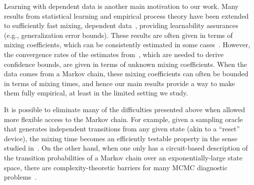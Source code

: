 Learning with dependent data is another main motivation to our work.
Many results from statistical learning and empirical process theory
have been extended to sufficiently fast mixing, dependent
data~\citep[e.g.,][]{Yu94,MR1921877,gamarnik03,MoRo08,MoRo09,DBLP:conf/nips/SteinwartC09,Steinwart2009175},
providing learnability assurances (e.g., generalization error bounds).
These results are often given in terms of mixing coefficients, which
can be consistently estimated in some cases~\citet{McDoShaSche11}.
However, the convergence rates of the estimates
from~\citet{McDoShaSche11}, which are needed to derive confidence
bounds, are given in terms of unknown mixing coefficients.
When the data comes from a Markov chain, these mixing coefficients can
often be bounded in terms of mixing times, and hence our main results
provide a way to make them fully empirical, at least in the limited setting we study.

It is possible to eliminate many of the difficulties presented above
when allowed more flexible access
to the Markov chain.
For example, given a sampling oracle that generates
independent transitions from any given state (akin to a ``reset''
device), the mixing time becomes an efficiently testable property in
the sense studied in~\citet{BaFoRuSmiWhi00,BaFoRuSmiWhi13}.
On the other hand, when one only has a circuit-based description of
the transition probabilities of a Markov chain over an
exponentially-large state space, there are complexity-theoretic
barriers for many MCMC diagnostic problems~\citet{BhaBoMo11}.

